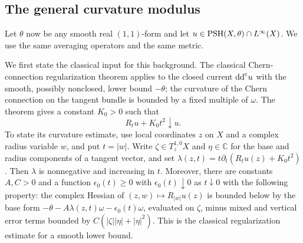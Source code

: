 \subsection{The general curvature modulus}
\label{subsec:general-curvature-modulus}

Let $\theta$ now be any smooth real $(1,1)$-form and let $u\in\mathrm{PSH}(X,\theta)\cap L^\infty(X)$. We use the same averaging operators and the same metric.

We first state the classical input for this background. The classical Chern-connection regularization theorem applies to the closed current $\mathrm{dd}^{\mathrm{c}} u$ with the smooth, possibly nonclosed, lower bound $-\theta$; the curvature of the Chern connection on the tangent bundle is bounded by a fixed multiple of $\omega$. The theorem gives a constant $K_0>0$ such that
\[
 R_tu+K_0t^2\downarrow u.
\]
To state its curvature estimate, use local coordinates $z$ on $X$ and a complex radius variable $w$, and put $t=|w|$. Write $\zeta\in T_z^{1,0}X$ and $\eta\in\mathbb C$ for the base and radius components of a tangent vector, and set $\lambda(z,t)=t\partial_t(R_tu(z)+K_0t^2)$. Then $\lambda$ is nonnegative and increasing in $t$. Moreover, there are constants $A,C>0$ and a function $\epsilon_0(t)\geq0$ with $\epsilon_0(t)\downarrow0$ as $t\downarrow0$ with the following property: the complex Hessian of $(z,w)\mapsto R_{|w|}u(z)$ is bounded below by the base form $-\theta-A\lambda(z,t)\omega-\epsilon_0(t)\omega$, evaluated on $\zeta$, minus mixed and vertical error terms bounded by $C(|\zeta||\eta|+|\eta|^2)$. This is the classical regularization estimate for a smooth lower bound.

